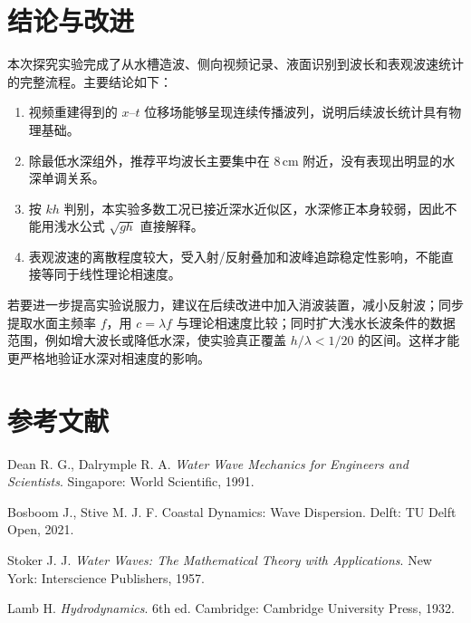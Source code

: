 \documentclass[UTF8,a4paper,11pt]{ctexart}
\begin{document}
\section{结论与改进}

本次探究实验完成了从水槽造波、侧向视频记录、液面识别到波长和表观波速统计的完整流程。主要结论如下：

\begin{enumerate}[leftmargin=2.2em,itemsep=0.25em]
  \item 视频重建得到的 $x$--$t$ 位移场能够呈现连续传播波列，说明后续波长统计具有物理基础。
  \item 除最低水深组外，推荐平均波长主要集中在 $8\,\mathrm{cm}$ 附近，没有表现出明显的水深单调关系。
  \item 按 $kh$ 判别，本实验多数工况已接近深水近似区，水深修正本身较弱，因此不能用浅水公式 $\sqrt{gh}$ 直接解释。
  \item 表观波速的离散程度较大，受入射/反射叠加和波峰追踪稳定性影响，不能直接等同于线性理论相速度。
\end{enumerate}

若要进一步提高实验说服力，建议在后续改进中加入消波装置，减小反射波；同步提取水面主频率 $f$，用 $c=\lambda f$ 与理论相速度比较；同时扩大浅水长波条件的数据范围，例如增大波长或降低水深，使实验真正覆盖 $h/\lambda<1/20$ 的区间。这样才能更严格地验证水深对相速度的影响。

\section*{参考文献}
\begin{enumerate}[label={[\arabic*]},leftmargin=2.2em,itemsep=0.15em]
  \item Dean R. G., Dalrymple R. A. \textit{Water Wave Mechanics for Engineers and Scientists}. Singapore: World Scientific, 1991.
  \item Bosboom J., Stive M. J. F. Coastal Dynamics: Wave Dispersion. Delft: TU Delft Open, 2021.
  \item Stoker J. J. \textit{Water Waves: The Mathematical Theory with Applications}. New York: Interscience Publishers, 1957.
  \item Lamb H. \textit{Hydrodynamics}. 6th ed. Cambridge: Cambridge University Press, 1932.
\end{enumerate}
\end{document}
